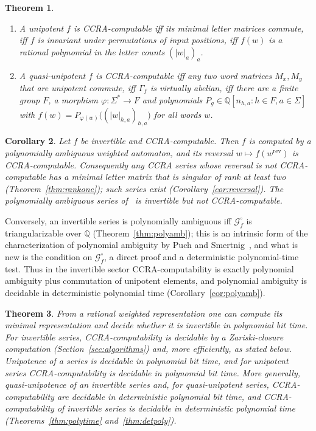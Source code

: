 \documentclass[acmlarge,screen,11pt,nonacm,natbib=false]{acmart}
\newcommand{\Q}{\mathbb{Q}}
\newcommand{\cG}{\mathcal{G}}
\newtheorem{theorem}{Theorem}
\newtheorem{corollary}[theorem]{Corollary}
\theoremstyle{definition}
\begin{document}
\begin{theorem}\label{thm:sectors}
\begin{enumerate}
\item A unipotent $f$ is CCRA-computable iff its minimal letter matrices commute, iff $f$ is invariant under permutations of input positions, iff $f(w)$ is a rational polynomial in the letter counts $(|w|_a)_a$.
\item A quasi-unipotent $f$ is CCRA-computable iff any two word matrices $M_x,M_y$ that are unipotent commute, iff $\Gamma_f$ is virtually abelian, iff there are a finite group $F$, a morphism $\varphi:\Sigma^*\to F$ and polynomials $P_g\in\Q[n_{h,a}:h\in F,a\in\Sigma]$ with $f(w)=P_{\varphi(w)}\bigl((|w|_{h,a})_{h,a}\bigr)$ for all words $w$.
\end{enumerate}
\end{theorem}

\begin{corollary}\label{cor:consequences}
Let $f$ be invertible and CCRA-computable. Then $f$ is computed by a polynomially ambiguous weighted automaton, and its reversal $w\mapsto f(w^{\mathrm{rev}})$ is CCRA-computable. Consequently any CCRA series whose reversal is not CCRA-computable has a minimal letter matrix that is singular of rank at least two (Theorem~\ref{thm:rankone}); such series exist (Corollary~\ref{cor:reversal}). The polynomially ambiguous series of~\cite[Example~17]{MPSfull} is invertible but not CCRA-computable.
\end{corollary}

Conversely, an invertible series is polynomially ambiguous iff $\cG_f^\circ$ is triangularizable over $\Q$ (Theorem~\ref{thm:polyamb}); this is an intrinsic form of the characterization of polynomial ambiguity by Puch and Smertnig~\cite{PS24}, and what is new is the condition on $\cG_f^\circ$, a direct proof and a deterministic polynomial-time test. Thus in the invertible sector CCRA-computability is exactly polynomial ambiguity plus commutation of unipotent elements, and polynomial ambiguity is decidable in deterministic polynomial time (Corollary~\ref{cor:polyamb}).

\begin{theorem}\label{thm:decision}
From a rational weighted representation one can compute its minimal representation and decide whether it is invertible in polynomial bit time. For invertible series, CCRA-computability is decidable by a Zariski-closure computation (Section~\ref{sec:algorithms}) and, more efficiently, as stated below. Unipotence of a series is decidable in polynomial bit time, and for unipotent series CCRA-computability is decidable in polynomial bit time. More generally, quasi-unipotence of an invertible series and, for quasi-unipotent series, CCRA-computability are decidable in deterministic polynomial bit time, and CCRA-computability of invertible series is decidable in deterministic polynomial time (Theorems~\ref{thm:polytime} and~\ref{thm:detpoly}).
\end{theorem}
\end{document}

